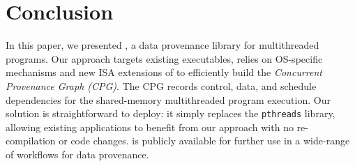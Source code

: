 \section{Conclusion}
\label{sec:conclusion}

In this paper, we presented \projecttitle, a data provenance library for multithreaded programs. Our approach targets existing executables, relies on OS-specific mechanisms and new ISA extensions of \intelpt  to efficiently build the {\em Concurrent Provenance Graph (CPG)}. The CPG records control, data, and schedule dependencies for the shared-memory multithreaded program execution. Our solution is straightforward to deploy: it simply replaces the {\tt pthreads} library, allowing existing applications to benefit from our approach with no re-compilation or code changes. \projecttitle is publicly available for further use in a wide-range of workflows for data provenance.

